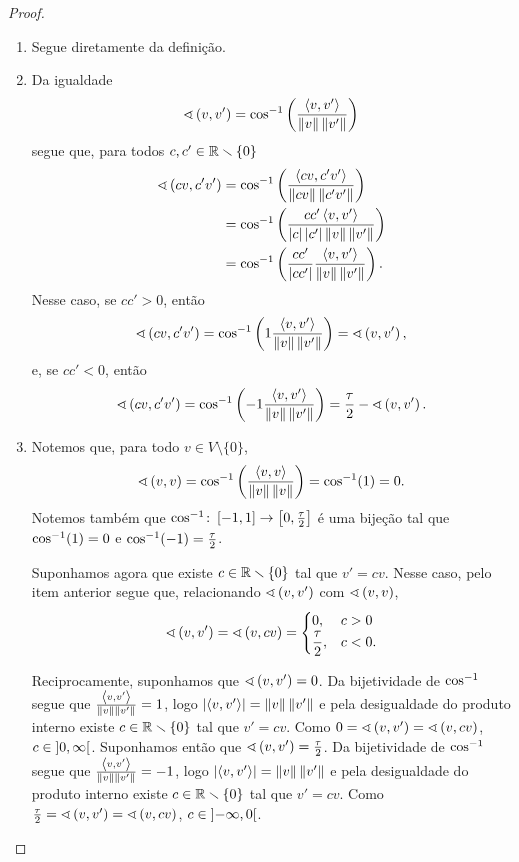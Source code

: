 \begin{proof}
	\begin{enumerate}
	\item Segue diretamente da definição.
	\item Da igualdade
	\begin{equation*}
	\ang{v}{v'} = \cos\inv\left(\frac{\inte{v}{v'}}{\nor{v}\nor{v'}}\right)
	\end{equation*}
segue que, para todos $c,c' \in \R\setminus\{0\}$
	\begin{align*}
	\ang{cv}{c'v'} &= \cos\inv\left(\frac{\inte{cv}{c'v'}}{\nor{cv}\nor{c'v'}}\right) \\
		&= \cos\inv\left(\frac{cc'\inte{v}{v'}}{\abs{c}\abs{c'}\nor{v}\nor{v'}}\right) \\
		&= \cos\inv\left(\frac{cc'}{\abs{cc'}}\frac{\inte{v}{v'}}{\nor{v}\nor{v'}}\right).
	\end{align*}
Nesse caso, se $cc' > 0$, então
	\begin{equation*}
	\ang{cv}{c'v'} = \cos\inv\left(1\frac{\inte{v}{v'}}{\nor{v}\nor{v'}}\right) = \ang{v}{v'},
	\end{equation*}
e, se $cc' < 0$, então
	\begin{equation*}
	\ang{cv}{c'v'} = \cos\inv\left(-1\frac{\inte{v}{v'}}{\nor{v}\nor{v'}}\right) = \frac{\tau}{2} - \ang{v}{v'}.
	\end{equation*}
	
	\item Notemos que, para todo $v \in V \setminus \{0\}$,
		\begin{equation*}
			\ang{v}{v} = \cos\inv\left(\frac{\inte{v}{v}}{\nor{v}\nor{v}}\right) = \cos\inv(1) = 0.
		\end{equation*}
Notemos também que $\cos\inv\colon \intff{-1}{1} \to \intff{0}{\frac{\tau}{2}}$ é uma bijeção tal que $\cos\inv(1)=0$ e $\cos\inv(-1) = \frac{\tau}{2}$.

Suponhamos agora que existe $c \in \R \setminus \{0\}$ tal que $v'=cv$. Nesse caso, pelo item anterior segue que, relacionando $\ang{v}{v'}$ com $\ang{v}{v}$,
		\begin{equation*}
		\ang{v}{v'} = \ang{v}{cv} = \begin{cases}
		0,& c>0 \\
		\displaystyle\frac{\tau}{2},& c<0.
	\end{cases}
		\end{equation*}

Reciprocamente, suponhamos que $\ang{v}{v'}=0$. Da bijetividade de $\cos\inv$ segue que $\frac{\inte{v}{v'}}{\nor{v}\nor{v'}} = 1$, logo $\abs{\inte{v}{v'}} = \nor{v}\nor{v'}$ e pela desigualdade do produto interno existe $c \in \R \setminus \{0\}$ tal que $v'=cv$. Como $0 = \ang{v}{v'} = \ang{v}{cv}$, $c \in \intaa{0}{\infty}$. Suponhamos então que $\ang{v}{v'}=\frac{\tau}{2}$. Da bijetividade de $\cos\inv$ segue que $\frac{\inte{v}{v'}}{\nor{v}\nor{v'}} = -1$, logo $\abs{\inte{v}{v'}} = \nor{v}\nor{v'}$ e pela desigualdade do produto interno existe $c \in \R \setminus \{0\}$ tal que $v'=cv$. Como $\frac{\tau}{2} = \ang{v}{v'} = \ang{v}{cv}$, $c \in \intaa{-\infty}{0}$.


\end{enumerate}
\end{proof}
